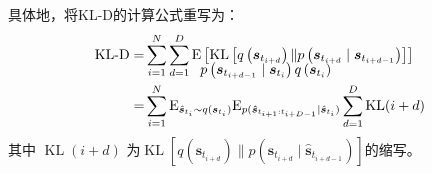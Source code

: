 具体地，将KL-D的计算公式重写为：
\begin{equation}
\begin{aligned}
\text{KL-D}=&\sum_{i=1}^{N}\sum_{d=1}^{D}\mathrm{E}\left[\operatorname{KL}\left[q\left(\boldsymbol{s}_{t_{i+d}} \right) \| p\left(\boldsymbol{s}_{t_{i+d}} \mid \boldsymbol{s}_{t_{i+d-1}}\right)\right]\right]\\[-15pt]
&\hspace{40pt}p\left(\boldsymbol{s}_{t_{i+d-1}} \mid\boldsymbol{s}_{t_{i}}\right){q\left(\boldsymbol{s}_{t_{i}} \right)}\\
=&\sum_{i=1}^{N}\mathrm{E}_{\hat{\boldsymbol{s}}_{t_i}\sim q(\boldsymbol{s}_{t_{i}})}\mathrm{E}_{p(\boldsymbol{\hat{s}}_{t_{i+1}:t_{i+D-1}}\mid \hat{\boldsymbol{s}}_{t_i})}\sum_{d=1}^{D}\operatorname{KL}(i+d)\\
\end{aligned}
\label{equ:reuse}
\end{equation}
其中 $\operatorname{KL}(i+d)$ 为$\operatorname{KL}\left[q\left(\boldsymbol{s}_{t_{i+d}} \right) \| p\left(\boldsymbol{s}_{t_{i+d}} \mid \boldsymbol{\hat s}_{t_{i+d-1}}\right)\right]$的缩写。
